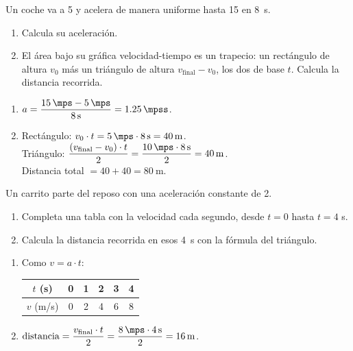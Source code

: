 \begin{exercise}
    Un coche va a \qty{5}{\mps} y acelera de manera uniforme hasta \qty{15}{\mps} en \qty{8}{\s}.
    \begin{enumerate}[label=\letraminuscula]
        \item Calcula su aceleración.
        \item El área bajo su gráfica velocidad-tiempo es un trapecio: un rectángulo de altura \(v_0\) más un triángulo de altura \(v_{\text{final}} - v_0\), los dos de base \(t\). Calcula la distancia recorrida.
    \end{enumerate}
    \begin{solu}
        \begin{enumerate}[label=\alph*)]
            \item \(a = \dfrac{\qty{15}{\mps} - \qty{5}{\mps}}{\qty{8}{\s}} = \qty{1.25}{\mpss}\).
            \item Rectángulo: \(v_0 \cdot t = \qty{5}{\mps} \cdot \qty{8}{\s} = \qty{40}{\m}\). \\
            Triángulo: \(\dfrac{(v_{\text{final}}-v_0)\cdot t}{2} = \dfrac{\qty{10}{\mps} \cdot \qty{8}{\s}}{2} = \qty{40}{\m}\). \\
            Distancia total \(= 40 + 40 = \qty{80}{\m}\).
        \end{enumerate}
    \end{solu}
\end{exercise}

\begin{exercise}
    Un carrito parte del reposo con una aceleración constante de \qty{2}{\mpss}.
    \begin{enumerate}[label=\letraminuscula]
        \item Completa una tabla con la velocidad cada segundo, desde \(t=0\) hasta \(t=4\) s.
        \item Calcula la distancia recorrida en esos \qty{4}{\s} con la fórmula del triángulo.
    \end{enumerate}
    \begin{solu}
        \begin{enumerate}[label=\alph*)]
            \item Como \(v = a \cdot t\):
            \begin{center}
                \begin{tabular}{cccccc}
                    \toprule
                    \(t\) (s) & 0 & 1 & 2 & 3 & 4 \\
                    \midrule
                    \(v\) (m/s) & 0 & 2 & 4 & 6 & 8 \\
                    \bottomrule
                \end{tabular}
            \end{center}
            \item \(\text{distancia} = \dfrac{v_{\text{final}} \cdot t}{2} = \dfrac{\qty{8}{\mps} \cdot \qty{4}{\s}}{2} = \qty{16}{\m}\).
        \end{enumerate}
    \end{solu}
\end{exercise}

